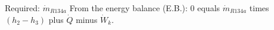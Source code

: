 Required: \( \dot{m}_{R134a} \)  
From the energy balance (E.B.):  
0 equals \( \dot{m}_{R134a} \) times \( (h_2 - h_3) \) plus \( \dot{Q} \) minus \( \dot{W}_k \).